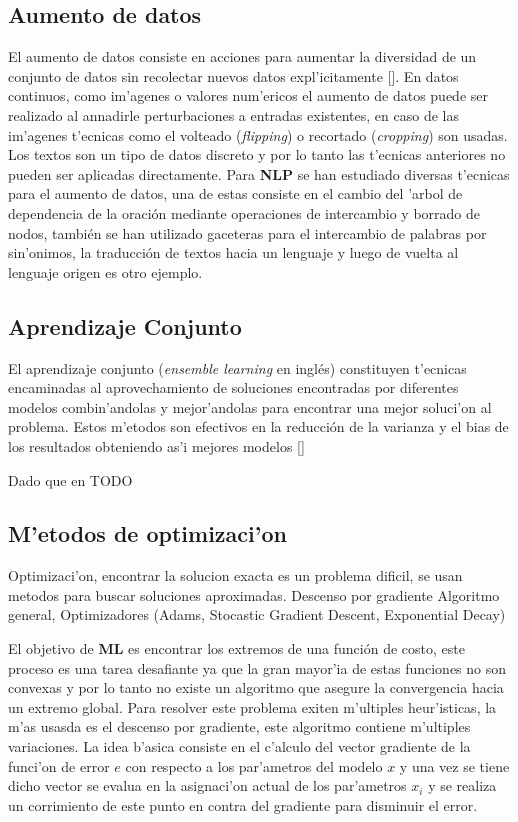 \subsection{Aumento de datos}

El aumento de datos consiste en acciones para aumentar la diversidad de un conjunto de datos sin recolectar
nuevos datos expl'icitamente [\cite{feng2021data}]. En datos continuos, como im'agenes o valores num'ericos el 
aumento de datos puede ser realizado al annadirle perturbaciones a entradas existentes, en caso de las im'agenes 
t'ecnicas como el volteado (\emph{flipping}) o recortado (\emph{cropping}) son usadas. Los textos son un tipo 
de datos discreto y por lo tanto las t'ecnicas anteriores no pueden ser aplicadas directamente. Para \textbf{NLP}
se han estudiado diversas t'ecnicas para el aumento de datos, una de estas consiste en el cambio del 'arbol de 
dependencia de la oración mediante operaciones de intercambio y borrado de nodos, también se han utilizado 
gaceteras para el intercambio de palabras por sin'onimos, la traducción de textos hacia un lenguaje y luego 
de vuelta al lenguaje origen es otro ejemplo. 

\subsection{Aprendizaje Conjunto}

El aprendizaje conjunto (\emph{ensemble learning} en inglés) constituyen t'ecnicas encaminadas al aprovechamiento
de soluciones encontradas por diferentes modelos combin'andolas y mejor'andolas para encontrar una mejor soluci'on 
al problema. Estos m'etodos son efectivos en la reducción de la varianza y el bias de los resultados obteniendo as'i
mejores modelos [\cite{dietterich2002ensemble}] 

Dado que en TODO 

\subsection{M'etodos de optimizaci'on}

Optimizaci'on, encontrar la solucion exacta es un problema dificil, se usan metodos para buscar soluciones aproximadas.
Descenso por gradiente Algoritmo general, Optimizadores (Adams, Stocastic Gradient Descent, Exponential Decay)

El objetivo de \textbf{ML} es encontrar los extremos de una función de costo, este proceso es una tarea 
desafiante ya que la gran mayor'ia de estas funciones no son convexas y por lo tanto no existe un algoritmo
que asegure la convergencia hacia un extremo global. Para resolver este problema exiten m'ultiples heur'isticas,
la m'as usasda es el descenso por gradiente, este algoritmo contiene m'ultiples variaciones. La idea b'asica consiste 
en el c'alculo del vector gradiente de la funci'on de error $e$ con respecto a los par'ametros del modelo $x$ y una vez se 
tiene dicho vector se evalua en la asignaci'on actual de los par'ametros $x_i$ y se realiza un corrimiento de este punto 
en contra del gradiente para disminuir el error.

